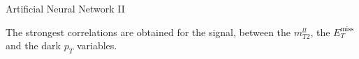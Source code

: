 \documentclass[handout,8 pt]{beamer}
\begin{document}
\begin{frame}{Artificial Neural Network II}
  \hspace{4pt}
   \begin{minipage}[c]{.02\linewidth}
	\begin{exampleblock}{}  \end{exampleblock}
   \end{minipage}	
   \hspace{5pt}
   \begin{minipage}[c]{.30\linewidth}
   \end{minipage} \hfill
   \begin{minipage}[c]{.30\linewidth}
   \end{minipage} \hfill
   \begin{minipage}[c]{.30\linewidth}
   	\justifying
	The strongest correlations are obtained for the signal, between the $m_{T2}^{ll}$, the $E_T^{\text{miss}}$ and the dark $p_T$ variables.
   \end{minipage} \hfill

\end{frame}
\end{document}
